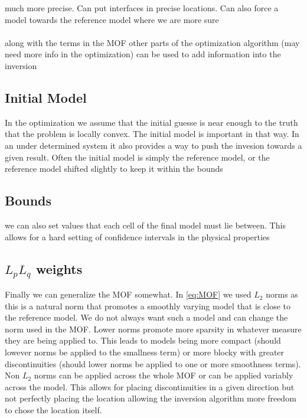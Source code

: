 much more precise. Can put interfaces in precise locations. Can also force a model towards the reference model where we are more sure
\\\\
along with the terms in the \ac{MOF} other parts of the optimization algorithm (may need more info in the optimization) can be used to add information into the inversion

\subsection{Initial Model}
\label{sec:Initial Model}

In the optimization we assume that the initial guesse is near enough to the truth that the problem is locally convex. The initial model is important in that way. In an under determined system it also provides a way to push the invesion towards a given result. Often the initial model is simply the reference model, or the reference model shifted slightly to keep it within the bounds

\subsection{Bounds}
\label{sec:Bounds}

we can also set values that each cell of the final model must lie between. This allows for a hard setting of confidence intervals in the physical properties

\subsection{$L_p L_q$ weights}
\label{sec:Lp Lq weights}

Finally we can generalize the \ac{MOF} somewhat. In \autoref{eq:MOF} we used $L_2$ norms as this is a natural norm that promotes a smoothly varying model that is close to the reference model. We do not always want such a model and can change the norm used in the \ac{MOF}. Lower norms promote more sparsity in whatever measure they are being applied to. This leads to models being more compact (should lowever norms be applied to the smallness term) or more blocky with greater discontinuities (should lower norms be applied to one or more smoothness terms). Non $L_2$ norms can be applied across the whole \ac{MOF} or can be applied variably across the model. This allows for placing discontinuities in a given direction but not perfectly placing the location allowing the inversion algorithm more freedom to chose the location itself.

